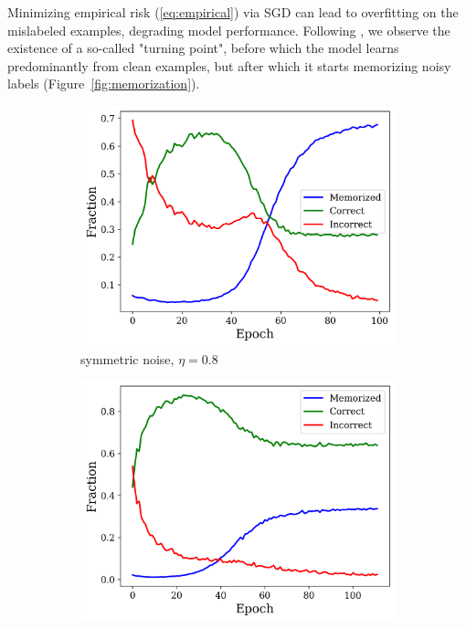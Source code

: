 \documentclass[12pt]{article}
\begin{document}
Minimizing empirical risk (\ref{eq:empirical}) via SGD can lead to overfitting on the mislabeled examples, degrading model performance. Following \citet{selc}, we observe the existence of a so-called "turning point", before which the model learns predominantly from clean examples, but after which it starts memorizing noisy labels (Figure~\ref{fig:memorization}).

\begin{figure}[htbp]
  \centering
  \begin{subfigure}[b]{0.45\textwidth}
    \centering
    \includegraphics[width=\textwidth]{figures/memorized_correct_incorrect_08.png}
    \caption{symmetric noise, $\eta=0.8$}
    \label{fig:sub1}
  \end{subfigure}
  \hfill
  \begin{subfigure}[b]{0.45\textwidth}
    \centering
    \includegraphics[width=\textwidth]{figures/memorized_correct_incorrect_04.png}

\end{subfigure}
\end{figure}
\end{document}
